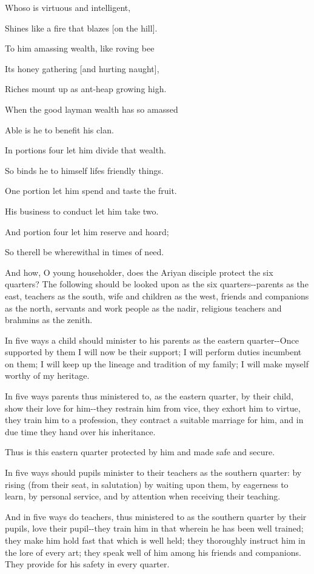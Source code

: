 \documentclass[12pt,twoside]{article}
\begin{document}
Whoso is virtuous and intelligent,

Shines like a fire that blazes [on the hill].

To him amassing wealth, like roving bee

Its honey gathering [and hurting naught],

Riches mount up as ant{}-heap growing high.

When the good layman wealth has so amassed

Able is he to benefit his clan.

In portions four let him divide that wealth.

So binds he to himself life{\textquotesingle}s friendly things.

One portion let him spend and taste the fruit.

His business to conduct let him take two.

And portion four let him reserve and hoard;

So there{\textquotesingle}ll be wherewithal in times of need.


\bigskip

And how, O young householder, does the Ariyan disciple protect the six
quarters? The following should be looked upon as the six
quarters{}-{}-parents as the east, teachers as the south, wife and
children as the west, friends and companions as the north, servants and
work people as the nadir, religious teachers and brahmins as the
zenith.

In five ways a child should minister to his parents as the eastern
quarter{}-{}-Once supported by them I will now be their support; I will
perform duties incumbent on them; I will keep up the lineage and
tradition of my family; I will make myself worthy of my heritage. 

In five ways parents thus ministered to, as the eastern quarter, by
their child, show their love for him{}-{}-they restrain him from vice,
they exhort him to virtue, they train him to a profession, they
contract a suitable marriage for him, and in due time they hand over
his inheritance.

Thus is this eastern quarter protected by him and made safe and secure.

In five ways should pupils minister to their teachers as the southern
quarter: by rising (from their seat, in salutation) by waiting upon
them, by eagerness to learn, by personal service, and by attention when
receiving their teaching.

And in five ways do teachers, thus ministered to as the southern quarter
by their pupils, love their pupil{}-{}-they train him in that wherein
he has been well trained; they make him hold fast that which is well
held; they thoroughly instruct him in the lore of every art; they speak
well of him among his friends and companions. They provide for his
safety in every quarter.
\end{document}
